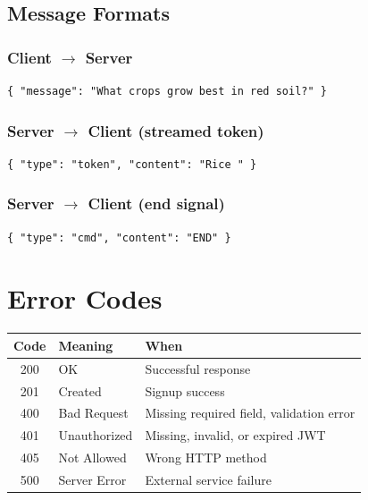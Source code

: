 \documentclass[11pt,a4paper]{article}
\begin{document}
\subsection{Message Formats}

\subsubsection*{Client $\to$ Server}
\begin{lstlisting}[style=jsonStyle]
{ "message": "What crops grow best in red soil?" }
\end{lstlisting}

\subsubsection*{Server $\to$ Client (streamed token)}
\begin{lstlisting}[style=jsonStyle]
{ "type": "token", "content": "Rice " }
\end{lstlisting}

\subsubsection*{Server $\to$ Client (end signal)}
\begin{lstlisting}[style=jsonStyle]
{ "type": "cmd", "content": "END" }
\end{lstlisting}

\section{Error Codes}

\begin{table}[H]
\centering
\begin{tabularx}{\textwidth}{c l X}
\toprule
\textbf{Code} & \textbf{Meaning} & \textbf{When} \\
\midrule
200 & OK              & Successful response \\
201 & Created         & Signup success \\
400 & Bad Request     & Missing required field, validation error \\
401 & Unauthorized    & Missing, invalid, or expired JWT \\
405 & Not Allowed     & Wrong HTTP method \\
500 & Server Error    & External service failure \\
\bottomrule
\end{tabularx}
\end{table}
\end{document}
